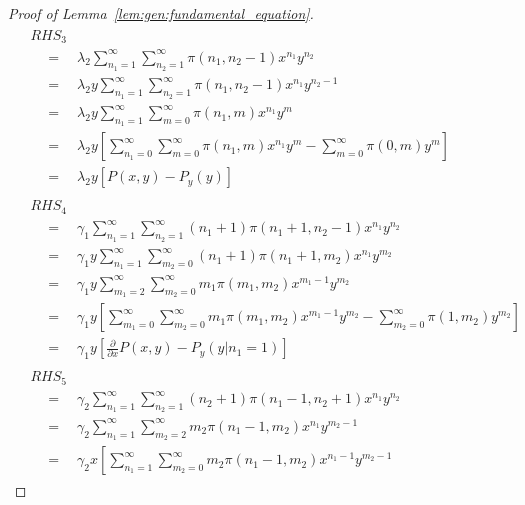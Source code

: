 \begin{proof}[Proof of Lemma~\ref{lem:gen:fundamental_equation}]
\begin{align*}
\begin{split}
            & RHS_3 \\
            & \quad = \quad \lambda_2 \sum_{n_1=1}^{\infty} \sum_{n_2=1}^{\infty} \pi(n_1, n_2-1) x^{n_1} y^{n_2} \\
            & \quad = \quad \lambda_2 y \sum_{n_1=1}^{\infty} \sum_{n_2=1}^{\infty} \pi(n_1, n_2-1) x^{n_1} y^{n_2-1} \\
            & \quad = \quad \lambda_2 y \sum_{n_1=1}^{\infty} \sum_{m=0}^{\infty} \pi(n_1, m) x^{n_1} y^{m} \\
            & \quad = \quad \lambda_2 y \left[
                \sum_{n_1=0}^{\infty} \sum_{m=0}^{\infty} \pi(n_1, m) x^{n_1} y^{m} - \sum_{m=0}^{\infty} \pi(0, m) y^m
            \right] \\
            & \quad = \quad \lambda_2 y \left[ P(x,y) - P_y(y) \right]
        \end{split} \\
        \begin{split}
            & RHS_4 \\
            & \quad = \quad \gamma_1 \sum_{n_1=1}^{\infty} \sum_{n_2=1}^{\infty} (n_1+1) \pi(n_1+1, n_2-1) x^{n_1} y^{n_2} \\
            & \quad = \quad \gamma_1 y \sum_{n_1=1}^{\infty} \sum_{m_2=0}^{\infty} (n_1+1) \pi(n_1+1, m_2) x^{n_1} y^{m_2} \\
            & \quad = \quad \gamma_1 y \sum_{m_1=2}^{\infty} \sum_{m_2=0}^{\infty} m_1 \pi(m_1, m_2) x^{m_1-1} y^{m_2} \\
            & \quad = \quad \gamma_1 y \left[
                \sum_{m_1=0}^{\infty} \sum_{m_2=0}^{\infty} m_1 \pi(m_1, m_2) x^{m_1-1} y^{m_2}
                - \sum_{m_2=0}^{\infty} \pi(1, m_2) y^{m_2}
            \right] \\
            & \quad = \quad \gamma_1 y \left[
                \frac{\partial}{\partial x} P(x,y) - P_y(y | n_1=1)
            \right]
        \end{split} \\
        \begin{split}
            & RHS_5 \\
            & \quad = \quad \gamma_2 \sum_{n_1=1}^{\infty} \sum_{n_2=1}^{\infty} (n_2+1) \pi(n_1-1, n_2+1) x^{n_1} y^{n_2} \\
            & \quad = \quad \gamma_2 \sum_{n_1=1}^{\infty} \sum_{m_2=2}^{\infty} m_2 \pi(n_1-1, m_2) x^{n_1} y^{m_2-1} \\
            & \quad = \quad \gamma_2 x \left[
                \sum_{n_1=1}^{\infty} \sum_{m_2=0}^{\infty} m_2 \pi(n_1-1, m_2) x^{n_1-1} y^{m_2-1}

\end{split}
\end{align*}
\end{proof}
